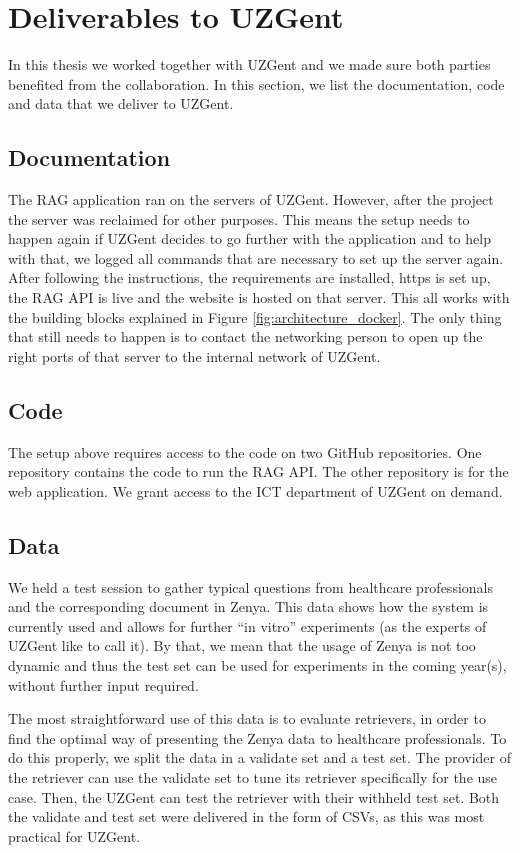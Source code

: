 \chapter{Deliverables to UZGent}

In this thesis we worked together with UZGent and we made sure both parties benefited from the collaboration. In this section, we list the documentation, code and data that we deliver to UZGent.

\section{Documentation}
The RAG application ran on the servers of UZGent. However, after the project the server was reclaimed for other purposes. This means the setup needs to happen again if UZGent decides to go further with the application and to help with that, we logged all commands that are necessary to set up the server again. After following the instructions, the requirements are installed, https is set up, the RAG API is live and the website is hosted on that server. This all works with the building blocks explained in Figure \ref{fig:architecture_docker}. The only thing that still needs to happen is to contact the networking person to open up the right ports of that server to the internal network of UZGent.

\section{Code}
The setup above requires access to the code on two GitHub repositories. One repository contains the code to run the RAG API. The other repository is for the web application. We grant access to the ICT department of UZGent on demand. 

\section{Data}
We held a test session to gather typical questions from healthcare professionals and the corresponding document in Zenya. This data shows how the system is currently used and allows for further ``in vitro'' experiments (as the experts of UZGent like to call it). By that, we mean that the usage of Zenya is not too dynamic and thus the test set can be used for experiments in the coming year(s), without further input required.

The most straightforward use of this data is to evaluate retrievers, in order to find the optimal way of presenting the Zenya data to healthcare professionals. To do this properly, we split the data in a validate set and a test set. The provider of the retriever can use the validate set to tune its retriever specifically for the use case. Then, the UZGent can test the retriever with their withheld test set. Both the validate and test set were delivered in the form of CSVs, as this was most practical for UZGent.

